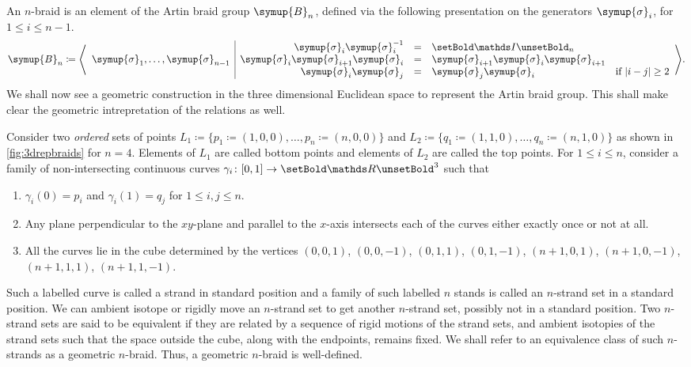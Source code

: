 \documentclass[oneside]{book}
\renewcommand{\symbb}[1]{\setBold \mathds #1 \unsetBold}
\newcommand{\B}{\symup{B}}
\newcommand{\sigmaa}{\symup{\sigma}}
\DeclarePairedDelimiter\abs{\lvert}{\rvert}
\newcommand{\rthree}{\symbb{R}^3}
\theoremstyle{definition}
\begin{document}
	An \(n\)-braid is an element of the Artin braid group \(\B_n\), defined via the following presentation on the generators \(\sigmaa_i\), for \(1 \leq i \leq n-1 \).
	\[\B_n \coloneq\Biggl\langle
	\begin{array}{c|rcll}
		& \sigmaa_i \sigmaa_i^{-1} &=& \symbb{I}_n &\\
		\sigmaa_1, \ldots, \sigmaa_{n-1} & \sigmaa_i \sigmaa_{i+1} \sigmaa_i &=& \sigmaa_{i+1} \sigmaa_i \sigmaa_{i+1} &\\
		& \sigmaa_i \sigmaa_j &=& \sigmaa_j \sigmaa_i &\text{if } \abs{i-j} \geq 2
	\end{array}
	\Biggr\rangle.\]
	We shall now see a geometric construction in the three dimensional Euclidean space to represent the Artin braid group. This shall make clear the geometric intrepretation of the relations as well.

	Consider two \textit{ordered} sets of points \(L_1 \coloneq \{p_1 \coloneq (1,0,0), \ldots, p_n \coloneq (n,0,0)\}\) and \(L_2 \coloneq \{q_1 \coloneq (1,1,0), \ldots, q_n \coloneq (n,1,0)\}\) as shown in \cref{fig:3drepbraids} for \(n=4\). Elements of \(L_1\) are called bottom points and elements of \(L_2\) are called the top points. For \(1 \leq i \leq n\), consider a family of non-intersecting continuous curves \(\gamma_i \colon [0, 1] \rightarrow \rthree\) such that
	\begin{enumerate}
		\item \(\gamma_i (0) = p_i\) and \(\gamma_i (1) = q_j\) for \(1 \leq i, j \leq n\).
		\item Any plane perpendicular to the \(xy\)-plane and parallel to the \(x\)-axis intersects each of the curves either exactly once or not at all.
		\item All the curves lie in the cube determined by the vertices \((0,0,1)\), \((0,0,-1)\), \((0,1,1)\), \((0,1,-1)\), \((n+1,0,1)\), \((n+1,0,-1)\), \((n+1,1,1)\), \((n+1,1,-1)\).
	\end{enumerate}
	Such a labelled curve is called a strand in standard position and a family of such labelled \(n\) stands is called an \(n\)-strand set in a standard position. We can ambient isotope or rigidly move an \(n\)-strand set to get another \(n\)-strand set, possibly not in a standard position. Two \(n\)-strand sets are said to be equivalent if they are related by a sequence of rigid motions of the strand sets, and ambient isotopies of the strand sets such that the space outside the cube, along with the endpoints, remains fixed. We shall refer to an equivalence class of such \(n\)-strands as a geometric \(n\)-braid. Thus, a geometric \(n\)-braid is well-defined.
\end{document}
